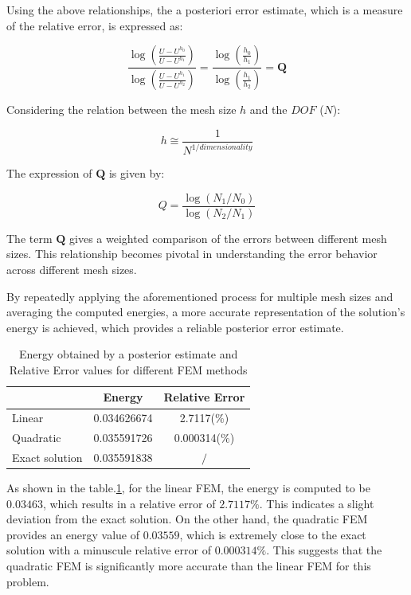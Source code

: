 \documentclass[twoside,twocolumn,10pt]{article}
\begin{document}
Using the above relationships, the a posteriori error estimate, which is a measure of the relative error, is expressed as:

\begin{equation}
\frac{\log \left( \frac{U-U^{h_0}}{U-U^{h_1}} \right)}{\log \left( \frac{U-U^{h_1}}{U-U^{h_2}} \right)} = \frac{\log \left( \frac{h_0}{h_1} \right)}{\log \left( \frac{h_1}{h_2} \right)} = \textbf{Q}
\label{eq:Q_relation}
\end{equation}

Considering the relation between the mesh size $h$ and the $DOF$ ($N$):

\begin{equation}
 h \cong \frac{1}{N^{1 / dimensionality}}
\end{equation}

The expression of $\textbf{Q}$ is given by:

\begin{equation}
  Q=\frac{\log \left(N_1 / N_0\right)}{\log \left(N_2 / N_1\right)}
\end{equation}

The term \( \textbf{Q} \) gives a weighted comparison of the errors between different mesh sizes. This relationship becomes pivotal in understanding the error behavior across different mesh sizes.

By repeatedly applying the aforementioned process for multiple mesh sizes and averaging the computed energies, a more accurate representation of the solution's energy is achieved, which provides a reliable posterior error estimate.

\begin{table}[!ht]
  \centering
  \begin{tabular}{|l|c|c|}
      \hline
      & \textbf{Energy} & \textbf{Relative Error} \\
      \hline
      Linear & 0.034626674 & 2.7117($\%$) \\
      \hline
      Quadratic & 0.035591726 & 0.000314($\%$) \\
      \hline
      Exact solution & 0.035591838 & $/$ \\
      \hline
  \end{tabular}
  \caption{Energy obtained by a posterior estimate and Relative Error values for different FEM methods}
  \label{tab:fem_values}
\end{table}

 As shown in the table.\ref{tab:fem_values}, for the linear FEM, the energy is computed to be \(0.03463\), which results in a relative error of \(2.7117\%\). This indicates a slight deviation from the exact solution. On the other hand, the quadratic FEM provides an energy value of \(0.03559\), which is extremely close to the exact solution with a minuscule relative error of \(0.000314\%\). This suggests that the quadratic FEM is significantly more accurate than the linear FEM for this problem. 
\end{document}
